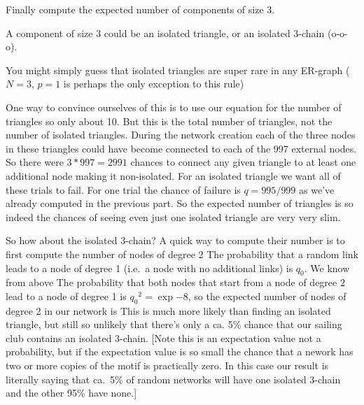\subquestion Finally compute the expected number of components of size 3. 

\solution A component of size 3 could be an isolated triangle, or an isolated 3-chain (o-o-o). 

You might simply guess that isolated triangles are super rare in any ER-graph ($N=3$, $p=1$ is perhaps the only exception to this rule) 

One way to convince ourselves of this is to use our equation for the number of triangles 
so only about 10. But this is the total number of triangles, not the number of isolated triangles. During the network creation each of the three nodes in these triangles could have become connected to each of the 997 external nodes. So there were $3*997=2991$ chances to connect any given triangle to at least one additional node making it non-isolated. For an isolated triangle we want all of these trials to fail. For one trial the chance of failure is $q=995/999$ as we've already computed in the previous part. So the expected number of triangles is 
so indeed the chances of seeing even just one isolated triangle are very very slim. 

So how about the isolated 3-chain? A quick way to compute their number is to first compute the number of nodes of degree 2
The probability that a random link leads to a node of degree 1 (i.e.~a node with no additional links) is $q_0$. We know from above 
The probability that both nodes that start from a node of degree 2 lead to a node of degree 1 is ${q_0}^2=\exp{-8}$, so the expected number of nodes of degree 2 in our network is 
This is much more likely than finding an isolated triangle, but still so unlikely that there's only a ca. 5\% chance that our sailing club contains an isolated 3-chain. [Note this is an expectation value not a probability, but if the expectation value is so small the chance that a nework has two or more copies of the motif is practically zero. In this case our result is literally saying that ca.~5\% of random networks will have one isolated 3-chain and the other 95\% have none.]
